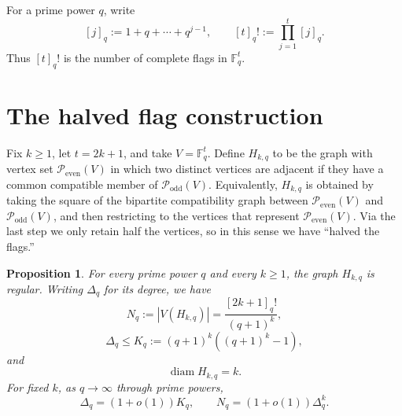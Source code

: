 \documentclass[11pt]{article}
\theoremstyle{plain}
\newtheorem{proposition}[theorem]{Proposition}
\theoremstyle{definition}
\DeclareMathOperator{\diam}{diam}
\begin{document}
For a prime power $q$, write
 $$[j]_q:=1+q+\cdots+q^{j-1},\qquad
  [t]_q!:=\prod_{j=1}^t[j]_q.$$
Thus $[t]_q!$ is the number of complete flags in $\mathbb F_q^t$.

\section{The halved flag construction}

Fix $k\ge1$, let $t=2k+1$, and take $V=\mathbb F_q^t$.  Define $H_{k,q}$ to be the graph with vertex set $\mathcal P_{\mathrm{even}}(V)$ in which two distinct vertices are adjacent if they have a common compatible member of $\mathcal P_{\mathrm{odd}}(V)$. Equivalently, $H_{k,q}$ is obtained by taking the square of the bipartite compatibility graph between $\mathcal P_{\mathrm{even}}(V)$ and $\mathcal P_{\mathrm{odd}}(V)$, and then restricting to the vertices that represent $\mathcal P_{\mathrm{even}}(V)$. Via the last step we only retain half the vertices, so in this sense we have ``halved the flags.''



\begin{proposition}\label{prop:H}
For every prime power $q$ and every $k\ge1$, the graph $H_{k,q}$ is regular. Writing $\Delta_q$ for its degree, we have
\begin{equation}\label{eq:H-order}
  N_q:=|V(H_{k,q})|=\frac{[2k+1]_q!}{(q+1)^k},
\end{equation}
\begin{equation}\label{eq:H-degree}
  \Delta_q\le K_q:=(q+1)^k\left((q+1)^k-1\right),
\end{equation}
and
\begin{equation}\label{eq:H-diameter}
  \diam H_{k,q}=k.
\end{equation}
For fixed $k$, as $q\to\infty$ through prime powers,
\begin{equation}\label{eq:H-asymptotic}
  \Delta_q=(1+o(1))K_q,
  \qquad
  N_q=(1+o(1))\Delta_q^k.
\end{equation}
\end{proposition}
\end{document}
